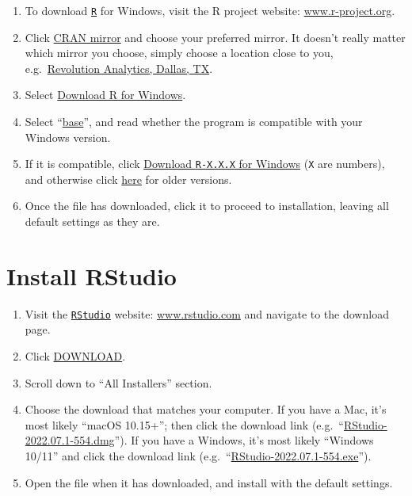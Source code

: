 \documentclass[
]{book}
\providecommand{\tightlist}{%
  \setlength{\itemsep}{0pt}\setlength{\parskip}{0pt}}
\begin{document}
\begin{enumerate}
\def\labelenumi{\arabic{enumi}.}
\tightlist
\item
  To download \href{https://www.r-project.org/}{\texttt{R}} for Windows, visit the R project website: \href{https://www.r-project.org/}{www.r-project.org}.
\item
  Click \href{https://cran.r-project.org/mirrors.html}{CRAN mirror} and choose your preferred mirror. It doesn't really matter which mirror you choose, simply choose a location close to you, e.g.~\href{https://cran.microsoft.com/}{Revolution Analytics, Dallas, TX}.
\item
  Select \href{https://cran.microsoft.com/bin/windows/}{Download R for Windows}.
\item
  Select ``\href{https://cran.microsoft.com/bin/windows/base/}{base}'', and read whether the program is compatible with your Windows version.
\item
  If it is compatible, click \href{https://cran.microsoft.com/bin/windows/base/}{Download \texttt{R-X.X.X} for Windows} (\texttt{X} are numbers), and otherwise click \href{https://support.microsoft.com/en-us/topic/update-for-universal-c-runtime-in-windows-c0514201-7fe6-95a3-b0a5-287930f3560c}{here} for older versions.
\item
  Once the file has downloaded, click it to proceed to installation, leaving all default settings as they are.
\end{enumerate}

\hypertarget{install-rstudio}{%
\section{Install RStudio}\label{install-rstudio}}

\begin{enumerate}
\def\labelenumi{\arabic{enumi}.}
\tightlist
\item
  Visit the \href{https://rstudio.com/}{\texttt{RStudio}} website: \href{https://www.rstudio.com/}{www.rstudio.com} and navigate to the download page.
\item
  Click \href{https://www.rstudio.com/products/rstudio/download/}{DOWNLOAD}.
\item
  Scroll down to ``All Installers'' section.
\item
  Choose the download that matches your computer. If you have a Mac, it's most likely ``macOS 10.15+''; then click the download link (e.g.~``\href{https://www.rstudio.com/products/rstudio/download/\#download}{RStudio-2022.07.1-554.dmg}''). If you have a Windows, it's most likely ``Windows 10/11'' and click the download link (e.g.~``\href{https://www.rstudio.com/products/rstudio/download/\#download}{RStudio-2022.07.1-554.exe}'').
\item
  Open the file when it has downloaded, and install with the default settings.
\end{enumerate}
\end{document}
